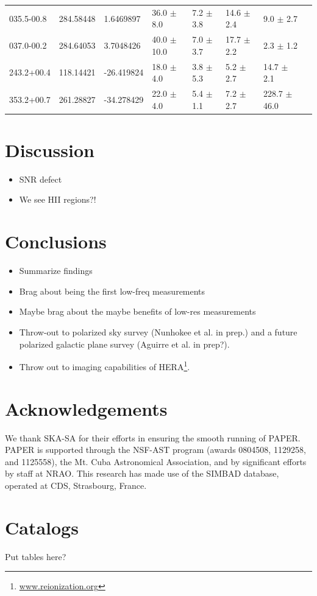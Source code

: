 \documentclass[useAMS,usenatbib]{mn2e}
\begin{document}
\begin{table}
\begin{tabular}{llllllll}
035.5-00.8 & 284.58448 & 1.6469897 & 36.0 $\pm$ 8.0 & 7.2 $\pm$ 3.8 & 14.6 $\pm$ 2.4 & 9.0 $\pm$ 2.7 \\
037.0-00.2 & 284.64053 & 3.7048426 & 40.0 $\pm$ 10.0 & 7.0 $\pm$ 3.7 & 17.7 $\pm$ 2.2 & 2.3 $\pm$ 1.2 \\
243.2+00.4 & 118.14421 & -26.419824 & 18.0 $\pm$ 4.0 & 3.8 $\pm$ 5.3 & 5.2 $\pm$ 2.7 & 14.7 $\pm$ 2.1 \\
353.2+00.7 & 261.28827 & -34.278429 & 22.0 $\pm$ 4.0 & 5.4 $\pm$ 1.1 & 7.2 $\pm$ 2.7 & 228.7 $\pm$ 46.0 \\
\hline
\end{tabular}
\label{tab:hii}
\end{table}




\section{Discussion}
\label{sec:disc}

\begin{itemize}
\item SNR defect
\item We see HII regions?!
\end{itemize}

\section{Conclusions}
\label{sec:conc}

\begin{itemize}
\item Summarize findings
\item Brag about being the first low-freq measurements
\item Maybe brag about the maybe benefits of low-res measurements
\item Throw-out to polarized sky survey (Nunhokee et al. in prep.) and a future polarized galactic plane survey (Aguirre et al. in prep?).
\item Throw out to imaging capabilities of HERA\footnote{\url{www.reionization.org}}.
\end{itemize}

\section*{Acknowledgements}
We thank SKA-SA for their efforts in ensuring the smooth running of PAPER. PAPER is supported through the NSF-AST program (awards 0804508, 1129258, and 1125558), the Mt. Cuba Astronomical Association, and by significant efforts by staff at NRAO. This research has made use of the SIMBAD database, operated at CDS, Strasbourg, France.


\appendix
\section{Catalogs}
Put tables here?

\clearpage

{}
\end{document}
